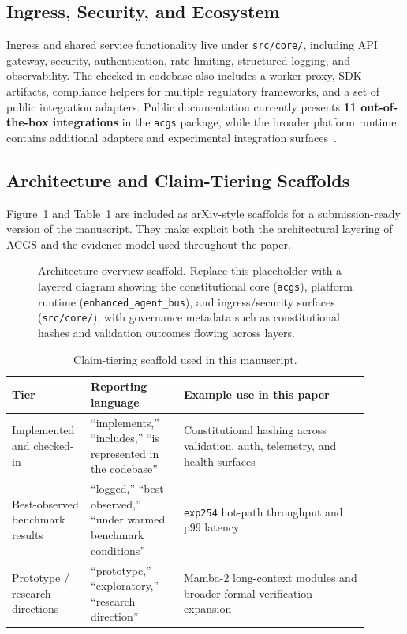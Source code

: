 \documentclass[11pt]{article}
\begin{document}
\subsection{Ingress, Security, and Ecosystem}
Ingress and shared service functionality live under \texttt{src/core/}, including API gateway, security, authentication, rate limiting, structured logging, and observability. The checked-in codebase also includes a worker proxy, SDK artifacts, compliance helpers for multiple regulatory frameworks, and a set of public integration adapters. Public documentation currently presents \textbf{11 out-of-the-box integrations} in the \texttt{acgs} package, while the broader platform runtime contains additional adapters and experimental integration surfaces~\cite{acgsrepo}.

\subsection{Architecture and Claim-Tiering Scaffolds}
Figure~\ref{fig:architecture-overview} and Table~\ref{tab:claim-tiers} are included as arXiv-style scaffolds for a submission-ready version of the manuscript. They make explicit both the architectural layering of ACGS and the evidence model used throughout the paper.

\begin{figure}[t]
  \centering
  \caption{Architecture overview scaffold. Replace this placeholder with a layered diagram showing the constitutional core (\texttt{acgs}), platform runtime (\texttt{enhanced\_agent\_bus}), and ingress/security surfaces (\texttt{src/core/}), with governance metadata such as constitutional hashes and validation outcomes flowing across layers.}
  \label{fig:architecture-overview}
\end{figure}

\begin{table}[t]
  \centering
  \caption{Claim-tiering scaffold used in this manuscript.}
  \label{tab:claim-tiers}
  \begin{tabular}{p{0.18\linewidth}p{0.24\linewidth}p{0.48\linewidth}}
    \toprule
    Tier & Reporting language & Example use in this paper \\
    \midrule
    Implemented and checked-in & ``implements,'' ``includes,'' ``is represented in the codebase'' & Constitutional hashing across validation, auth, telemetry, and health surfaces \\
    Best-observed benchmark results & ``logged,'' ``best-observed,'' ``under warmed benchmark conditions'' & \texttt{exp254} hot-path throughput and p99 latency \\
    Prototype / research directions & ``prototype,'' ``exploratory,'' ``research direction'' & Mamba-2 long-context modules and broader formal-verification expansion \\
    \bottomrule
  \end{tabular}
\end{table}
\end{document}
